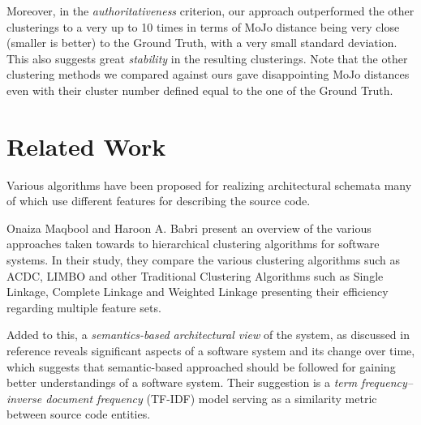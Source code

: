 \documentclass[sigconf,review, anonymous]{acmart}
\begin{document}
Moreover, in the \emph{authoritativeness} criterion, our approach outperformed the other clusterings to a very up to 10 times in terms of MoJo distance being very close (smaller is better) to the Ground Truth, with a very small standard deviation. This also suggests great
\emph{stability} in the resulting clusterings. Note that the other clustering methods we compared against ours gave disappointing MoJo distances even with their cluster number defined 
equal to the one of the Ground Truth. 


\section{Related Work}



Various algorithms have been proposed for realizing architectural schemata many of which use 
different features for describing the source code. 

Onaiza Maqbool and Haroon A. Babri \cite{maqbool_overview} present an
overview of the various approaches taken towards to hierarchical clustering algorithms
for software systems. In their study, they compare the various clustering algorithms
such as ACDC, LIMBO and other Traditional Clustering Algorithms such as Single
Linkage, Complete Linkage \cite{complete} and Weighted Linkage presenting their efficiency regarding 
multiple feature sets. 

Added to this, a \emph{semantics-based architectural view} of the system, as discussed in reference
\cite{large_study} reveals significant aspects of a software system and its change over 
time, which suggests that semantic-based approached should be followed for gaining better 
understandings of a software system. Their suggestion is a \emph{term frequency--inverse 
document frequency} (TF-IDF) model serving as a similarity metric between source code 
entities. 
\end{document}
